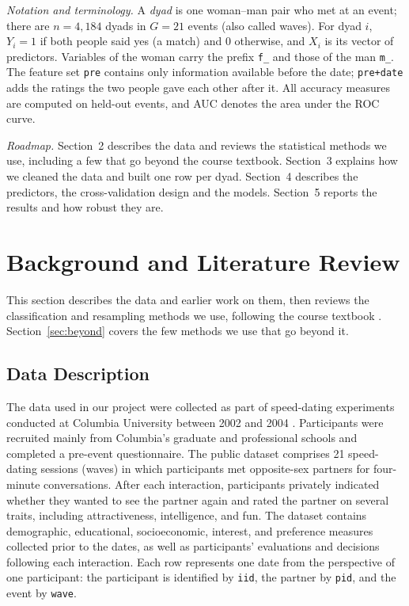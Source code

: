 \documentclass[11pt,letterpaper,reqno]{amsart}
\numberwithin{equation}{subsection}
\theoremstyle{definition}
\numberwithin{thm}{subsection}
\begin{document}
\emph{Notation and terminology.} A \emph{dyad} is one woman--man pair who met at an event; there are $n=4{,}184$ dyads in
$G=21$ events (also called waves). For dyad $i$, $Y_i=1$ if both people said yes (a match) and $0$ otherwise, and $X_i$
is its vector of predictors. Variables of the woman carry the prefix \texttt{f\_} and those of the man \texttt{m\_}.
The feature set \texttt{pre} contains only information available before the date; \texttt{pre+date} adds the ratings
the two people gave each other after it. All accuracy measures are computed on held-out events, and AUC denotes the
area under the ROC curve.

\emph{Roadmap.} Section~2 describes the data and reviews the statistical methods we use, including a few that go
beyond the course textbook. Section~3 explains how we cleaned the data and built one row per dyad. Section~4 describes
the predictors, the cross-validation design and the models. Section~5 reports the results and how robust they are.

\section{Background and Literature Review}

This section describes the data and earlier work on them, then reviews the classification and resampling methods we
use, following the course textbook \cite{James:2023}. Section~\ref{sec:beyond} covers the few methods we use that go
beyond it.

\subsection{Data Description}
The data used in our project were collected as part of speed-dating experiments conducted at Columbia University between 2002 and 2004 \cite[Section II]{Fisman:2006}. Participants were recruited mainly from Columbia's graduate and professional schools and completed a pre-event questionnaire. The public dataset comprises 21 speed-dating sessions (waves) in which participants met opposite-sex partners for four-minute conversations. After each interaction, participants privately indicated whether they wanted to see the partner again and rated the partner on several traits, including attractiveness, intelligence, and fun. The dataset contains demographic, educational, socioeconomic, interest, and preference measures collected prior to the dates, as well as participants' evaluations and decisions following each interaction. Each row represents one date from the perspective of one participant: the participant is identified by \texttt{iid}, the partner by \texttt{pid}, and the event by \texttt{wave}.
\end{document}
